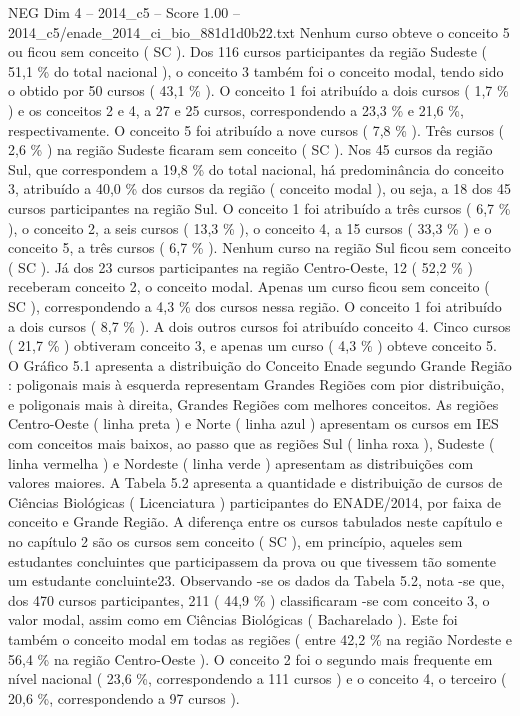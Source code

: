 \begin{textsample}{NEG Dim 4 – 2014\_c5 – Score 1.00 – 2014\_c5/enade\_2014\_ci\_bio\_881d1d0b22.txt}
Nenhum curso obteve o conceito 5 ou ficou sem conceito ( SC ).
Dos 116 cursos participantes da região Sudeste ( 51,1 \% do total nacional ), o conceito 3 também foi o conceito modal, tendo sido o obtido por 50 cursos ( 43,1 \% ).
O conceito 1 foi atribuído a dois cursos ( 1,7 \% ) e os conceitos 2 e 4, a 27 e 25 cursos, correspondendo a 23,3 \% e 21,6 \%, respectivamente.
O conceito 5 foi atribuído a nove cursos ( 7,8 \% ).
Três cursos ( 2,6 \% ) na região Sudeste ficaram sem conceito ( SC ).
Nos 45 cursos da região Sul, que correspondem a 19,8 \% do total nacional, há predominância do conceito 3, atribuído a 40,0 \% dos cursos da região ( conceito modal ), ou seja, a 18 dos 45 cursos participantes na região Sul.
O conceito 1 foi atribuído a três cursos ( 6,7 \% ), o conceito 2, a seis cursos ( 13,3 \% ), o conceito 4, a 15 cursos ( 33,3 \% ) e o conceito 5, a três cursos ( 6,7 \% ).
Nenhum curso na região Sul ficou sem conceito ( SC ).
Já dos 23 cursos participantes na região Centro-Oeste, 12 ( 52,2 \% ) receberam conceito 2, o conceito modal.
Apenas um curso ficou sem conceito ( SC ), correspondendo a 4,3 \% dos cursos nessa região.
O conceito 1 foi atribuído a dois cursos ( 8,7 \% ).
A dois outros cursos foi atribuído conceito 4.
Cinco cursos ( 21,7 \% ) obtiveram conceito 3, e apenas um curso ( 4,3 \% ) obteve conceito 5.
O Gráfico 5.1 apresenta a distribuição do Conceito Enade segundo Grande Região : poligonais mais à esquerda representam Grandes Regiões com pior distribuição, e poligonais mais à direita, Grandes Regiões com melhores conceitos.
As regiões Centro-Oeste ( linha preta ) e Norte ( linha azul ) apresentam os cursos em IES com conceitos mais baixos, ao passo que as regiões Sul ( linha roxa ), Sudeste ( linha vermelha ) e Nordeste ( linha verde ) apresentam as distribuições com valores maiores.
A Tabela 5.2 apresenta a quantidade e distribuição de cursos de Ciências Biológicas ( Licenciatura ) participantes do ENADE/2014, por faixa de conceito e Grande Região.
A diferença entre os cursos tabulados neste capítulo e no capítulo 2 são os cursos sem conceito ( SC ), em princípio, aqueles sem estudantes concluintes que participassem da prova ou que tivessem tão somente um estudante concluinte23.
Observando -se os dados da Tabela 5.2, nota -se que, dos 470 cursos participantes, 211 ( 44,9 \% ) classificaram -se com conceito 3, o valor modal, assim como em Ciências Biológicas ( Bacharelado ).
Este foi também o conceito modal em todas as regiões ( entre 42,2 \% na região Nordeste e 56,4 \% na região Centro-Oeste ).
O conceito 2 foi o segundo mais frequente em nível nacional ( 23,6 \%, correspondendo a 111 cursos ) e o conceito 4, o terceiro ( 20,6 \%, correspondendo a 97 cursos ).

\end{textsample}
